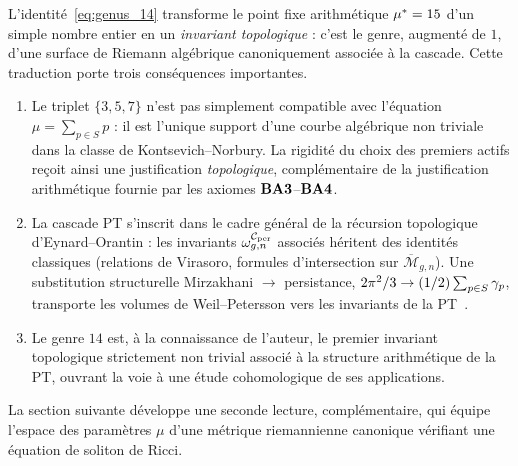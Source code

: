 L'identité~\eqref{eq:genus_14} transforme le point fixe arithmétique $\mu^{*} = 15$ d'un simple nombre entier en un \emph{invariant topologique} : c'est le genre, augmenté de $1$, d'une surface de Riemann algébrique canoniquement associée à la cascade. Cette traduction porte trois conséquences importantes.

\begin{enumerate}[nosep,leftmargin=*]
\item Le triplet $\{3, 5, 7\}$ n'est pas simplement compatible avec l'équation $\mu = \sum_{p \in S} p$ : il est l'unique support d'une courbe algébrique non triviale dans la classe de Kontsevich--Norbury. La rigidité du choix des premiers actifs reçoit ainsi une justification \emph{topologique}, complémentaire de la justification arithmétique fournie par les axiomes $\textbf{BA3}$--$\textbf{BA4}$.
\item La cascade PT s'inscrit dans le cadre général de la récursion topologique d'Eynard--Orantin : les invariants $\omega_{g,n}^{\mathcal{C}_{\rm per}}$ associés héritent des identités classiques (relations de Virasoro, formules d'intersection sur $\overline{\mathcal M}_{g,n}$). Une substitution structurelle Mirzakhani $\to$ persistance, $2\pi^{2}/3 \to (1/2) \sum_{p \in S} \gamma_{p}$, transporte les volumes de Weil--Petersson vers les invariants de la PT~\cite[\S 8]{PT_GeoFlow_PersistenceCurve}.
\item Le genre $14$ est, à la connaissance de l'auteur, le premier invariant topologique strictement non trivial associé à la structure arithmétique de la PT, ouvrant la voie à une étude cohomologique de ses applications.
\end{enumerate}
La section suivante développe une seconde lecture, complémentaire, qui équipe l'espace des paramètres $\mu$ d'une métrique riemannienne canonique vérifiant une équation de soliton de Ricci.
